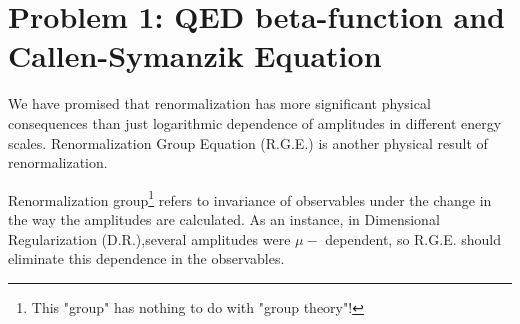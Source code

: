 \documentclass[11pt]{article}
\begin{document}
	
	
	\psetheader
	
	\section*{Problem 1: QED beta-function and Callen-Symanzik Equation}
	
	\begin{problem}
		We have promised that renormalization has more significant physical consequences than just logarithmic dependence of amplitudes in different energy scales. Renormalization Group Equation (R.G.E.) is another physical result of renormalization.
		
		Renormalization group\footnote{This "group" has nothing to do with "group theory"!} refers to invariance of observables under the change in the way the amplitudes are calculated. As an instance, in Dimensional Regularization (D.R.),several amplitudes were $\mu-$ dependent, so R.G.E. should eliminate this dependence in the observables.
		
	\end{problem}
\end{document}
